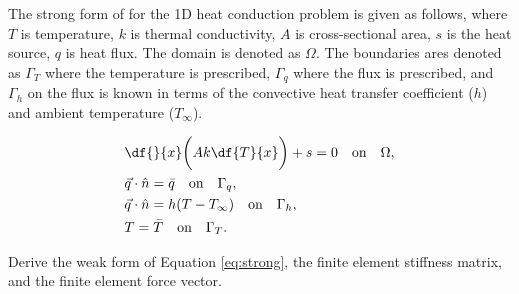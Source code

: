 The strong form of for the 1D heat conduction problem is given as follows, where $T$ is temperature, $k$ is thermal conductivity, $A$ is cross-sectional area, $s$ is the heat source, $q$ is heat flux. The domain is denoted as $\Omega$. The boundaries ares denoted as $\Gamma_T$ where the temperature is prescribed, $\Gamma_q$ where the flux is prescribed, and $\Gamma_h$ on the flux is known in terms of the convective heat transfer coefficient ($h$) and ambient temperature ($T_{\infty}$).

\begin{equation}\begin{split}\label{eq:strong}
& \df{}{x}\bigg({Ak \df{T}{x}}\bigg) + s = 0 \quad \text{on} \quad \Omega, \\
& \vec{q}\cdot \hat{n} = \bar{q} \quad \text{on} \quad \Gamma_q, \\
& \vec{q}\cdot \hat{n} = h(T - T_{\infty}) \quad \text{on} \quad \Gamma_h, \\
& T = \bar{T} \quad \text{on} \quad \Gamma_T.
\end{split}\end{equation}

Derive the weak form of Equation \eqref{eq:strong}, the finite element stiffness matrix, and the finite element force vector.